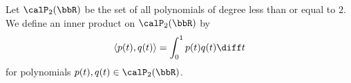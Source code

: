\begin{questions}
  \question Let $\calP_2(\bbR)$ be the set of all polynomials of degree
  less than or equal to $2$. We define an inner product on $\calP_2(\bbR)$
  by
  \[
    \langle p(t),q(t) \rangle=\int_0^1 p(t)q(t)\diff t
  \]
  for polynomials $p(t),q(t)\in\calP_2(\bbR)$.
  \question
\end{questions}


